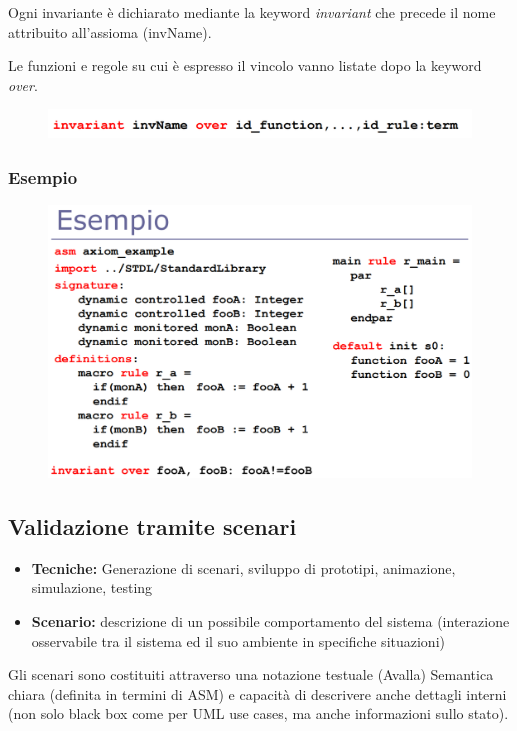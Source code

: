 \noindent Ogni invariante è dichiarato mediante la keyword \textit{invariant} che precede il nome attribuito all'assioma (invName).

\noindent  Le funzioni e regole su cui è espresso il vincolo vanno listate dopo la keyword \textit{over}.

\begin{figure}[H]
    \includegraphics[width=0.8\linewidth]{chapters/2/images/invariant.png}
\end{figure}

\subsubsection{Esempio}
\begin{figure}[H]
    \includegraphics[width=0.8\linewidth]{chapters/2/images/esempioinvariant.png}
\end{figure}


\subsection{Validazione tramite scenari}
\begin{itemize}
    \item \textbf{Tecniche:} Generazione di scenari, sviluppo di prototipi, animazione, simulazione, testing 
    \item \textbf{Scenario:} descrizione di un possibile comportamento del sistema (interazione osservabile tra il sistema ed il suo
    ambiente in specifiche situazioni)
\end{itemize}

\noindent Gli scenari sono costituiti attraverso una notazione testuale (Avalla)
Semantica chiara (definita in termini di ASM) e capacità di descrivere anche dettagli interni (non solo black box come per UML use cases, ma
anche informazioni sullo stato).

